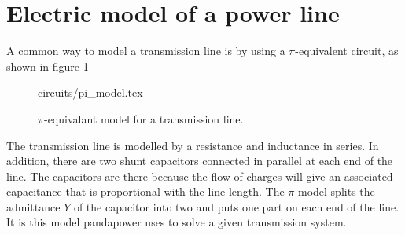 \documentclass[class=book, crop=false]{standalone}
\begin{document}
\section{Electric model of a power line}
A common way to model a transmission line is by using a $\pi$-equivalent circuit, as shown in figure \ref{fig:theory:PI_model}

\begin{figure}[ht!]
    \center
    {circuits/pi_model.tex}
    \caption{$\pi$-equivalant model for a transmission line.}
    \label{fig:theory:PI_model}
\end{figure}



The transmission line is modelled by a resistance and inductance in series. In addition, there are two shunt capacitors connected in parallel at each end of the line. The capacitors are there because the flow of charges will give an associated capacitance that is proportional with the line length. The $\pi$-model splits the admittance $Y$ of the capacitor into two and puts one part on each end of the line. It is this model pandapower uses to solve a given transmission system. 
\end{document}
